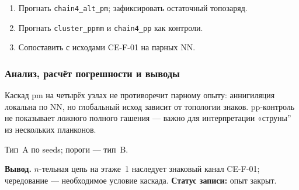 \begin{enumerate}[label=\textbf{Шаг \arabic*:},leftmargin=*,itemsep=0.35em]
\item Прогнать \texttt{chain4\_alt\_pm}; зафиксировать остаточный топозаряд.
\item Прогнать \texttt{cluster\_ppmm} и \texttt{chain4\_pp} как контроли.
\item Сопоставить с исходами CE-F-01 на парных NN.
\end{enumerate}

\subsubsection*{Анализ, расчёт погрешности и выводы}
Каскад pm на четырёх узлах не противоречит парному опыту: аннигиляция локальна по NN, но глобальный исход зависит от топологии знаков.
pp-контроль не показывает ложного полного гашения --- важно для интерпретации «струны'' из нескольких планконов.

Тип~A по seeds; пороги --- тип~B.

\textbf{Вывод.}
$n$-тельная цепь на этаже~1 наследует знаковый канал CE-F-01; чередование --- необходимое условие каскада.
\textbf{Статус записи:} опыт закрыт.
